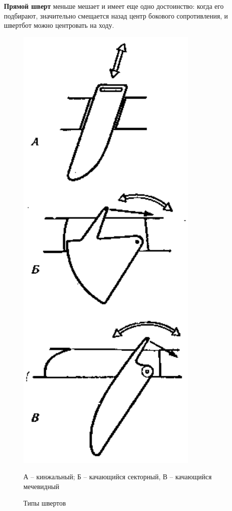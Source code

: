 \documentclass[a4paper, 12pt, twoside, final]{scrbook}
\begin{document}
\textbf{Прямой шверт} меньше мешает и имеет еще одно достоинство:
когда его подбирают, значительно смещается назад центр бокового сопротивления,
и швертбот можно центровать на ходу.

\begin{figure}%
\begin{centering}
\includegraphics{pics/Tipy_shvertov}
\par\end{centering}

\protect\caption{\label{fig:33}Типы швертов}


\centering{}\small А \--- кинжальный; Б \--- качающийся секторный, В \--- качающийся мечевидный
\end{figure}
\end{document}
